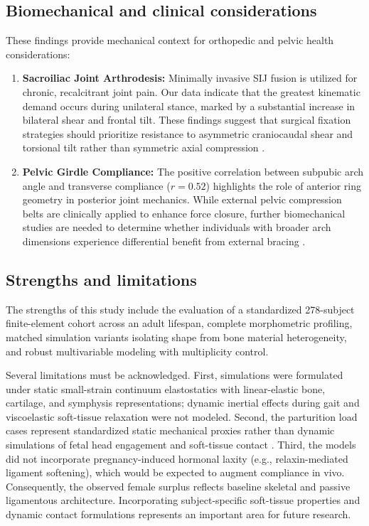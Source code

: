 \subsection*{Biomechanical and clinical considerations}
These findings provide mechanical context for orthopedic and pelvic health considerations:
\begin{enumerate}
\item \textbf{Sacroiliac Joint Arthrodesis:} Minimally invasive SIJ fusion is utilized for chronic, recalcitrant joint pain. Our data indicate that the greatest kinematic demand occurs during unilateral stance, marked by a substantial increase in bilateral shear and frontal tilt. These findings suggest that surgical fixation strategies should prioritize resistance to asymmetric craniocaudal shear and torsional tilt rather than symmetric axial compression \citep{Kiapour2019,Anderson2020}.
\item \textbf{Pelvic Girdle Compliance:} The positive correlation between subpubic arch angle and transverse compliance ($r = 0.52$) highlights the role of anterior ring geometry in posterior joint mechanics. While external pelvic compression belts are clinically applied to enhance force closure, further biomechanical studies are needed to determine whether individuals with broader arch dimensions experience differential benefit from external bracing \citep{Vleeming2012,Hammer2013}.
\end{enumerate}

\subsection*{Strengths and limitations}
The strengths of this study include the evaluation of a standardized 278-subject finite-element cohort across an adult lifespan, complete morphometric profiling, matched simulation variants isolating shape from bone material heterogeneity, and robust multivariable modeling with multiplicity control.

Several limitations must be acknowledged. First, simulations were formulated under static small-strain continuum elastostatics with linear-elastic bone, cartilage, and symphysis representations; dynamic inertial effects during gait and viscoelastic soft-tissue relaxation were not modeled. Second, the parturition load cases represent standardized static mechanical proxies rather than dynamic simulations of fetal head engagement and soft-tissue contact \citep{ChenGrimm2021,Almeida2024Uterus,BiomechPregnancy2022}. Third, the models did not incorporate pregnancy-induced hormonal laxity (e.g., relaxin-mediated ligament softening), which would be expected to augment compliance in vivo. Consequently, the observed female surplus reflects baseline skeletal and passive ligamentous architecture. Incorporating subject-specific soft-tissue properties and dynamic contact formulations represents an important area for future research.
